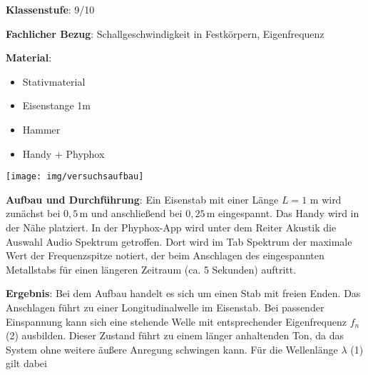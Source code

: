 \documentclass[../main.tex]{subfiles}
\begin{document}
\begin{tcolorbox}[
    width=\textwidth,
    height=\textheight,
    title=Phyphox: Schallgeschwindigkeit in Festkörpern,
    fonttitle=\Large,
    before title=\vspace{0.2cm}, after title=\vspace{0.2cm},
    colback=white,
    title filled=true, 
    colbacktitle=myorange,
    colframe=black,
    coltitle=black,
    ]

    \vspace{0.2cm}
    \textbf{Klassenstufe}: 9/10

    \vspace{0.4cm}

    \textbf{Fachlicher Bezug}: Schallgeschwindigkeit in Festkörpern, Eigenfrequenz

    \begin{minipage}[]{0.5\textwidth}
        \vspace{0.4cm} 
        \textbf{Material}:
        \begin{itemize}[noitemsep]
            \item Stativmaterial
            \item Eisenstange 1m
            \item Hammer
            \item Handy + Phyphox
        \end{itemize}

    \end{minipage}
    \hspace{1.4cm}
    \begin{minipage}[]{0.45\textwidth}
        \vspace{0.3cm}
        \texttt{[image: img/versuchsaufbau]}
    \end{minipage}

    \vspace{0.4cm}
    \textbf{Aufbau und Durchführung}: Ein Eisenstab mit einer Länge $L=1$ m wird zunächst bei $0,5\,$m und anschließend bei $0,25\,$m eingespannt. Das Handy wird in der Nähe platziert. In der Phyphox-App wird unter dem Reiter \glqq Akustik\grqq{} die Auswahl \glqq Audio Spektrum\grqq{} getroffen. Dort wird im Tab \glqq Spektrum\grqq{} der maximale Wert der Frequenzspitze notiert, der beim Anschlagen des eingespannten Metallstabs für einen längeren Zeitraum (ca. 5 Sekunden) auftritt.

    \vspace{0.4cm}
    \textbf{Ergebnis}: Bei dem Aufbau handelt es sich um einen Stab mit freien Enden. Das Anschlagen führt zu einer Longitudinalwelle im Eisenstab. Bei passender Einspannung kann sich eine stehende Welle mit entsprechender Eigenfrequenz $f_n$ (2) ausbilden. Dieser Zustand führt zu einem länger anhaltenden Ton, da das System ohne weitere äußere Anregung schwingen kann. Für die Wellenlänge $\lambda$ (1) gilt dabei


\end{tcolorbox}
\end{document}
